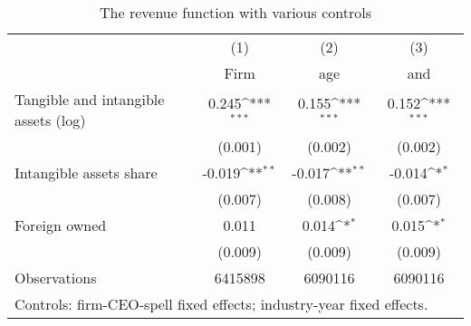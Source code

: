 \begin{table}[htbp]\centering
\def\sym#1{\ifmmode^{#1}\else\(^{#1}\)\fi}
\caption{The revenue function with various controls}
\begin{tabular}{l*{3}{c}}
\hline\hline
                    &\multicolumn{1}{c}{(1)}&\multicolumn{1}{c}{(2)}&\multicolumn{1}{c}{(3)}\\
                    &\multicolumn{1}{c}{Firm}&\multicolumn{1}{c}{age}&\multicolumn{1}{c}{and}\\
\hline
Tangible and intangible assets (log)&       0.245\sym{***}&       0.155\sym{***}&       0.152\sym{***}\\
                    &     (0.001)         &     (0.002)         &     (0.002)         \\
[1em]
Intangible assets share&      -0.019\sym{**} &      -0.017\sym{**} &      -0.014\sym{*}  \\
                    &     (0.007)         &     (0.008)         &     (0.007)         \\
[1em]
Foreign owned       &       0.011         &       0.014\sym{*}  &       0.015\sym{*}  \\
                    &     (0.009)         &     (0.009)         &     (0.009)         \\
\hline
Observations        &     6415898         &     6090116         &     6090116         \\
\hline\hline
\multicolumn{4}{l}{\footnotesize Controls: firm-CEO-spell fixed effects; industry-year fixed effects.}\\
\end{tabular}
\end{table}
